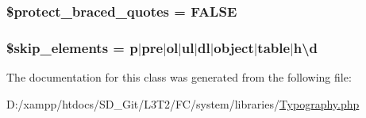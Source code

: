 \subsubsection[{\$protect\+\_\+braced\+\_\+quotes}]{\setlength{\rightskip}{0pt plus 5cm}\$protect\+\_\+braced\+\_\+quotes = F\+A\+L\+S\+E}\label{class_c_i___typography_a6a74364571da23cc7187c864cde167ca}
\hypertarget{class_c_i___typography_a80c70a349bff88ad1ef94dea8753bc2e}{}
\subsubsection[{\$skip\+\_\+elements}]{\setlength{\rightskip}{0pt plus 5cm}\$skip\+\_\+elements = \textquotesingle{}p$\vert$pre$\vert$ol$\vert$ul$\vert$dl$\vert$object$\vert$table$\vert${\bf h\textbackslash{}d}\textquotesingle{}}\label{class_c_i___typography_a80c70a349bff88ad1ef94dea8753bc2e}


The documentation for this class was generated from the following file\+:\begin{DoxyCompactItemize}
\item 
D\+:/xampp/htdocs/\+S\+D\+\_\+\+Git/\+L3\+T2/\+F\+C/system/libraries/\hyperlink{_typography_8php}{Typography.\+php}\end{DoxyCompactItemize}
